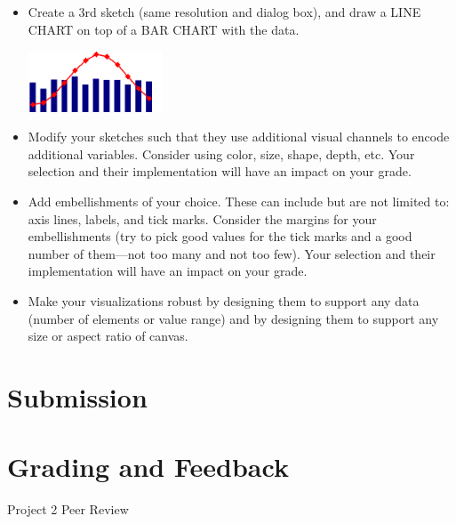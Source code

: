 \documentclass[a4paper,12pt]{article}
\begin{document}
\begin{itemize}
\item Create a 3rd sketch (same resolution and dialog box), and draw a LINE CHART on top of a BAR CHART with the data.

\begin{center}
\includegraphics[width=4cm]{../images/bar_and_line_chart.png}
\end{center}


\item Modify your sketches such that they use additional visual channels to encode additional variables. Consider using color, size, shape, depth, etc. Your selection and their implementation will have an impact on your grade.

\item Add embellishments of your choice. These can include but are not limited to: axis lines, labels, and tick marks. Consider the margins for your embellishments (try to pick good values for the tick marks and a good number of them---not too many and not too few). Your selection and their implementation will have an impact on your grade.

\item Make your visualizations robust by designing them to support any data (number of elements or value range) and by designing them to support any size or aspect ratio of canvas.

\end{itemize}


\section{Submission}


\section{Grading and Feedback}

\feedback




\newpage


\begin{center}
{\huge Project 2 Peer Review}
\end{center}
\end{document}

